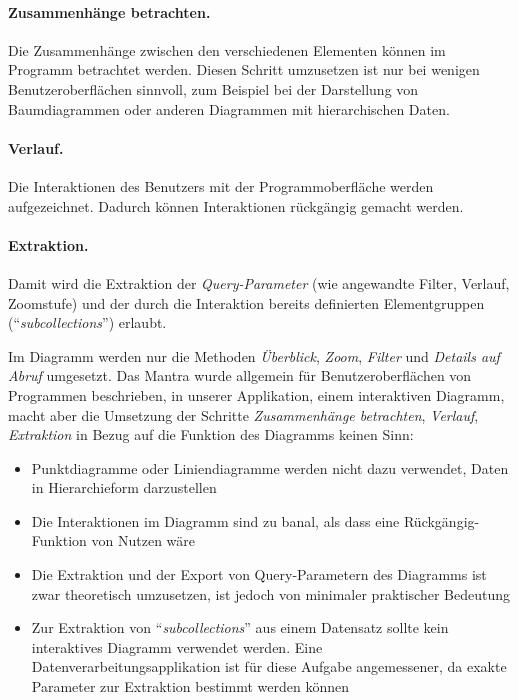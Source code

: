 \paragraph{Zusammenhänge betrachten.} Die Zusammenhänge zwischen den verschiedenen Elementen können im Programm betrachtet werden. Diesen Schritt umzusetzen ist nur bei wenigen Benutzeroberflächen sinnvoll, zum Beispiel bei der Darstellung von Baumdiagrammen oder anderen Diagrammen mit hierarchischen Daten.

\paragraph{Verlauf.} Die Interaktionen des Benutzers mit der Programmoberfläche werden aufgezeichnet. Dadurch können Interaktionen rückgängig gemacht werden.

\paragraph{Extraktion.} Damit wird die Extraktion der \textit{Query-Parameter} (wie angewandte Filter, Verlauf, Zoomstufe) und der durch die Interaktion bereits definierten Elementgruppen ("`\textit{subcollections}"') erlaubt.

Im Diagramm werden nur die Methoden \textit{Überblick}, \textit{Zoom}, \textit{Filter} und \textit{Details auf Abruf} umgesetzt. Das Mantra wurde allgemein für Benutzeroberflächen von Programmen beschrieben, in unserer Applikation, einem interaktiven Diagramm, macht aber die Umsetzung der Schritte \textit{Zusammenhänge betrachten}, \textit{Verlauf}, \textit{Extraktion} in Bezug auf die Funktion des Diagramms keinen Sinn:

\begin{itemize}
	\item Punktdiagramme oder Liniendiagramme werden nicht dazu verwendet, Daten in Hierarchieform darzustellen
	\item Die Interaktionen im Diagramm sind zu banal, als dass eine Rückgängig-Funktion von Nutzen wäre
	\item Die Extraktion und der Export von Query-Parametern des Diagramms ist zwar theoretisch umzusetzen, ist jedoch von minimaler praktischer Bedeutung
	\item Zur Extraktion von "`\textit{subcollections}"' aus einem Datensatz sollte kein interaktives Diagramm verwendet werden. Eine Datenverarbeitungsapplikation ist für diese Aufgabe angemessener, da exakte Parameter zur Extraktion bestimmt werden können
\end{itemize}
